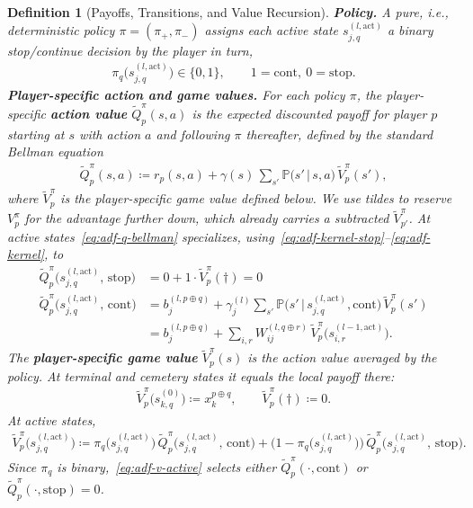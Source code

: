 \documentclass[twoside]{article}
\renewcommand{\P}{\mathbb{P}}
\newcommand{\1}{\mathbf{1}}
\newtheorem{definition}{Definition}
\begin{document}
\begin{definition}[Payoffs, Transitions, and Value Recursion]
\textbf{Policy.} A pure, i.e., deterministic policy $\pi = (\pi_+, \pi_-)$ assigns each active
state $s_{j,q}^{(l, \mathrm{act})}$ a binary stop/continue decision by the player in turn,
\begin{align}
    \pi_q\bigl(s_{j,q}^{(l, \mathrm{act})}\bigr) \in \{0, 1\},
    \qquad
    1 = \mathrm{cont},\ 0 = \mathrm{stop}.
\end{align}
\textbf{Player-specific action and game values.} For each policy $\pi$, the player-specific
\textbf{action value} $\tilde{Q}_p^\pi(s, a)$ is the expected discounted payoff for player $p$
starting at $s$ with action $a$ and following $\pi$ thereafter, defined by the standard Bellman
equation
\begin{align}\label{eq:adf-q-bellman}
    \tilde{Q}_p^\pi(s, a) \coloneqq r_p(s, a) + \gamma(s)\, \textstyle\sum_{s'} \P\bigl(s' \,\big|\, s,
    a\bigr)\, \tilde{V}_p^\pi(s'),
\end{align}
where $\tilde{V}_p^\pi$ is the player-specific game value defined below. We use tildes to reserve
$V_p^\pi$ for the advantage further down, which already carries a subtracted $\tilde{V}_{p'}^\pi$.
At active states~\eqref{eq:adf-q-bellman} specializes,
using~\eqref{eq:adf-kernel-stop}--\eqref{eq:adf-kernel}, to
\begin{align}\label{eq:adf-q-stop}
    \tilde{Q}_p^\pi\bigl(s_{j,q}^{(l, \mathrm{act})},\, \mathrm{stop}\bigr) &= 0 + 1 \cdot
    \tilde{V}_p^\pi(\dagger) = 0 \\ \label{eq:adf-q-cont}
    \tilde{Q}_p^\pi\bigl(s_{j,q}^{(l, \mathrm{act})},\, \mathrm{cont}\bigr)
    &= b_j^{(l, p \oplus q)} + \gamma_j^{(l)} \textstyle\sum_{s'} \P\bigl(s' \,\big|\, s_{j,q}^{(l,
    \mathrm{act})}, \mathrm{cont}\bigr)\, \tilde{V}_p^\pi(s') \\
    &= b_j^{(l, p \oplus q)} + \sum_{i,r} W_{ij}^{(l, q \oplus r)}\,
    \tilde{V}_p^\pi\bigl(s_{i,r}^{(l-1, \mathrm{act})}\bigr).
\end{align}
The \textbf{player-specific game value} $\tilde{V}_p^\pi(s)$ is the action value averaged by the
policy. At terminal and cemetery states it equals the local payoff there:
\begin{align}\label{eq:adf-v-terminal}
    \tilde{V}_p^\pi\bigl(s_{k,q}^{(0)}\bigr) \coloneqq x_k^{p \oplus q},
    \qquad
    \tilde{V}_p^\pi(\dagger) \coloneqq 0.
\end{align}
At active states,
\begin{align}\label{eq:adf-v-active}
    \tilde{V}_p^\pi\bigl(s_{j,q}^{(l, \mathrm{act})}\bigr) \coloneqq \pi_q\bigl(s_{j,q}^{(l,
    \mathrm{act})}\bigr)\, \tilde{Q}_p^\pi\bigl(s_{j,q}^{(l, \mathrm{act})},\, \mathrm{cont}\bigr) +
    \bigl(1 - \pi_q\bigl(s_{j,q}^{(l, \mathrm{act})}\bigr)\bigr)\, \tilde{Q}_p^\pi\bigl(s_{j,q}^{(l,
    \mathrm{act})},\, \mathrm{stop}\bigr).
\end{align}
Since $\pi_q$ is binary,~\eqref{eq:adf-v-active} selects either $\tilde{Q}_p^\pi(\cdot,
    \mathrm{cont})$ or $\tilde{Q}_p^\pi(\cdot, \mathrm{stop}) = 0$.


\end{definition}
\end{document}
